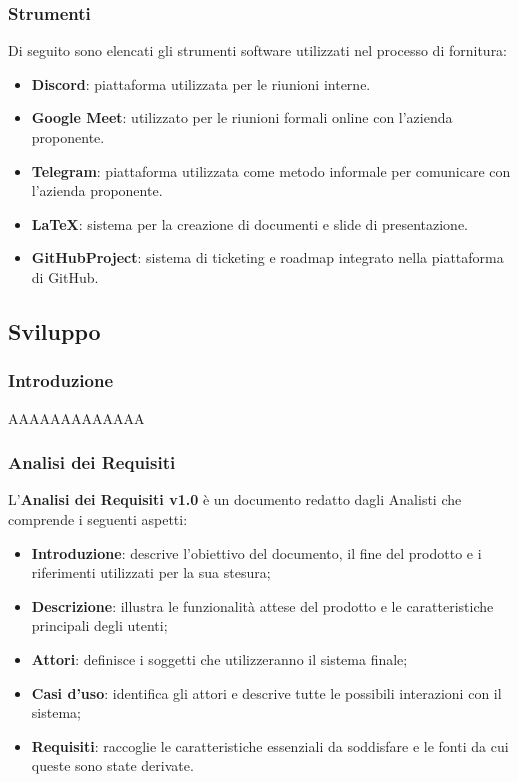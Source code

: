 \subsubsection{Strumenti}
Di seguito sono elencati gli strumenti software utilizzati nel processo di fornitura:
\begin{itemize}
    \item \textbf{Discord}: piattaforma utilizzata per le riunioni interne.
    \item \textbf{Google Meet}: utilizzato per le riunioni formali online con l'azienda proponente.
    \item \textbf{Telegram}: piattaforma utilizzata come metodo informale per comunicare con l'azienda proponente.
    \item \textbf{LaTeX}: sistema per la creazione di documenti e slide di presentazione.
    \item \textbf{GitHubProject}: sistema di ticketing e roadmap integrato nella piattaforma di GitHub. 
\end{itemize}









\subsection{Sviluppo}
\subsubsection{Introduzione}

AAAAAAAAAAAAA
\subsubsection{Analisi dei Requisiti}

L'\textbf{Analisi dei Requisiti v1.0} è un documento redatto dagli Analisti che comprende i seguenti aspetti:
\begin{itemize}
    \item \textbf{Introduzione}: descrive l’obiettivo del documento, il fine del prodotto e i riferimenti utilizzati per la sua stesura;
    \item \textbf{Descrizione}: illustra le funzionalità attese del prodotto e le caratteristiche principali degli utenti;
    \item \textbf{Attori}: definisce i soggetti che utilizzeranno il sistema finale;
    \item \textbf{Casi d’uso}: identifica gli attori e descrive tutte le possibili interazioni con il sistema;
    \item \textbf{Requisiti}: raccoglie le caratteristiche essenziali da soddisfare e le fonti da cui queste sono state derivate.
\end{itemize}

